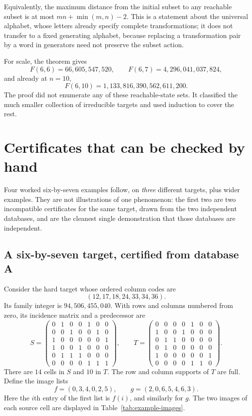 \documentclass[11pt,letterpaper]{article}
\numberwithin{equation}{section}
\theoremstyle{definition}
\theoremstyle{remark}
\newcommand{\dbA}{\textsf{A}}
\begin{document}
Equivalently, the maximum distance from the initial subset to any reachable
subset is at most $mn+\min(m,n)-2$. This is a statement about the universal
alphabet, whose letters already specify complete transformations; it does not
transfer to a fixed generating alphabet, because replacing a transformation
pair by a word in generators need not preserve the subset action.

For scale, the theorem gives
\[
 F(6,6)=66,605,547,520,\qquad
 F(6,7)=4,296,041,037,824,
\]
and already at $n=10$,
\[
 F(6,10)=1,133,816,390,562,611,200 .
\]
The proof did not enumerate any of these reachable-state sets. It
classified the much smaller collection of irreducible targets and used
induction to cover the rest.

\section{Certificates that can be checked by hand}
\label{sec:example}
Four worked six-by-seven examples follow, on \emph{three} different targets,
plus wider examples. They are not illustrations of one phenomenon: the first
two are two incompatible certificates for the same target, drawn from the two
independent databases, and are the cleanest single demonstration that those
databases are independent.

\subsection{A six-by-seven target, certified from database \dbA{}}
\label{sec:ex-shared}
Consider the hard target whose ordered column codes are
\[
 (12,17,18,24,33,34,36).
\]
Its family integer is $94,506,455,040$. With rows and columns numbered
from zero, its incidence matrix and a predecessor are
\begingroup\setlength{\arraycolsep}{3pt}
\[
 S=\begin{pmatrix}
 0&1&0&0&1&0&0\\
 0&0&1&0&0&1&0\\
 1&0&0&0&0&0&1\\
 1&0&0&1&0&0&0\\
 0&1&1&1&0&0&0\\
 0&0&0&0&1&1&1
 \end{pmatrix},\qquad
 T=\begin{pmatrix}
 0&0&0&0&1&0&0\\
 1&0&0&1&0&0&0\\
 0&1&1&0&0&0&0\\
 0&1&0&0&0&0&0\\
 1&0&0&0&0&0&1\\
 0&0&0&0&1&1&0
 \end{pmatrix}.
\]
\endgroup
There are $14$ cells in $S$ and $10$ in $T$. The row and column supports of
$T$ are full. Define the image lists
\[
 f=(0,3,4,0,2,5),\qquad g=(2,0,6,5,4,6,3).
\]
Here the $i$th entry of the first list is $f(i)$, and similarly for $g$.
The two images of each source cell are displayed in
Table~\ref{tab:example-images}.
\end{document}
